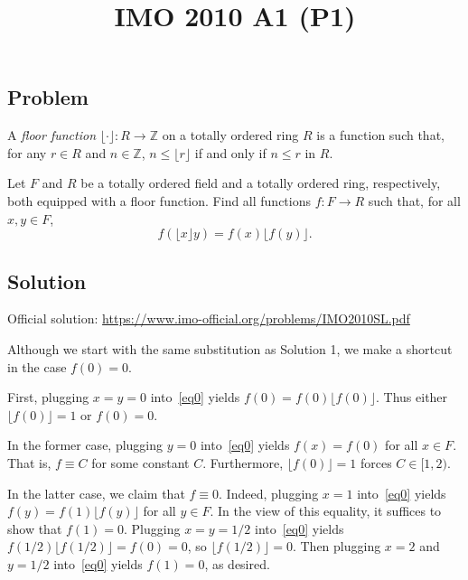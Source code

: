 \documentclass{article}
\title{IMO 2010 A1 (P1)}
\author{}
\date{}
\newcommand{\Z}{\mathbb{Z}}
\begin{document}
\maketitle



\subsection*{Problem}

A \emph{floor function} $\lfloor \cdot \rfloor : R \to \Z$ on a totally ordered ring $R$ is a function such that, for any $r \in R$ and $n \in \Z$, $n \leq \lfloor r \rfloor$ if and only if $n \leq r$ in $R$.

Let $F$ and $R$ be a totally ordered field and a totally ordered ring, respectively, both equipped with a floor function.
Find all functions $f : F \to R$ such that, for all $x, y \in F$,
\[ f(\lfloor x \rfloor y) = f(x) \lfloor f(y) \rfloor. \tag{*}\label{eq0} \]



\subsection*{Solution}

Official solution: \url{https://www.imo-official.org/problems/IMO2010SL.pdf}

Although we start with the same substitution as Solution 1, we make a shortcut in the case $f(0) = 0$.

First, plugging $x = y = 0$ into~\eqref{eq0} yields $f(0) = f(0) \lfloor f(0) \rfloor$.
Thus either $\lfloor f(0) \rfloor = 1$ or $f(0) = 0$.

In the former case, plugging $y = 0$ into~\eqref{eq0} yields $f(x) = f(0)$ for all $x \in F$.
That is, $f \equiv C$ for some constant $C$.
Furthermore, $\lfloor f(0) \rfloor = 1$ forces $C \in [1, 2)$.

In the latter case, we claim that $f \equiv 0$.
Indeed, plugging $x = 1$ into~\eqref{eq0} yields $f(y) = f(1) \lfloor f(y) \rfloor$ for all $y \in F$.
In the view of this equality, it suffices to show that $f(1) = 0$.
Plugging $x = y = 1/2$ into~\eqref{eq0} yields $f(1/2) \lfloor f(1/2) \rfloor = f(0) = 0$, so $\lfloor f(1/2) \rfloor = 0$.
Then plugging $x = 2$ and $y = 1/2$ into~\eqref{eq0} yields $f(1) = 0$, as desired.
\end{document}
